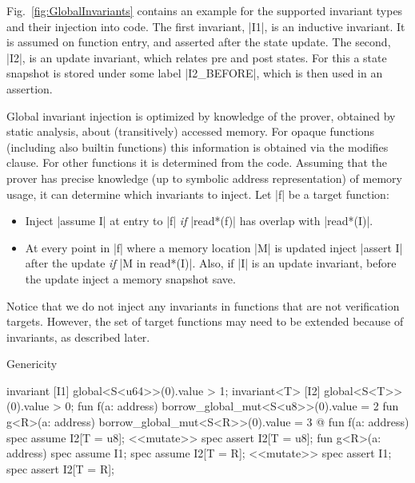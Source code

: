Fig.~\ref{fig:GlobalInvariants} contains an example for the supported invariant
types and their injection into code. The first invariant, |I1|, is an inductive
invariant. It is assumed on function entry, and asserted after the state
update. The second, |I2|, is an update invariant, which relates pre and
post states. For this a state snapshot is stored under some label |I2_BEFORE|,
which is then used in an assertion.


Global invariant injection is optimized by knowledge of the prover, obtained
by static analysis, about (transitively) accessed memory. For opaque functions
(including also builtin functions) this information is obtained via the modifies
clause. For other functions it is determined from the code.  Assuming that the
prover has precise knowledge (up to symbolic address representation) of memory
usage, it can determine which invariants to inject. Let |f| be a target function:

\begin{itemize}
\item Inject |assume I| at entry to |f| \emph{if} |read*(f)| has overlap with
  |read*(I)|.
\item At every point in |f| where a memory location |M| is updated inject
  |assert I| after the update \emph{if} |M in read*(I)|. Also, if |I| is an
  update invariant, before the update inject a memory snapshot save.
\end{itemize}

Notice that we do not inject any invariants in functions that are not
verification targets. However, the set of target functions may need to be
extended because of invariants, as described later.



\begin{Figure}
  \caption{Genericity}
  \label{fig:Genericity}
  \centering
\begin{MoveBox}
  invariant [I1] global<S<u64>>(0).value > 1;
  invariant<T> [I2] global<S<T>>(0).value > 0;
  fun f(a: address) { borrow_global_mut<S<u8>>(0).value = 2 }
  fun g<R>(a: address) { borrow_global_mut<S<R>>(0).value = 3 }
  @\transform@
  fun f(a: address) {
    spec assume I2[T = u8];
    <<mutate>>
    spec assert I2[T = u8];
  }
  fun g<R>(a: address) {
    spec assume I1;
    spec assume I2[T = R];
    <<mutate>>
    spec assert I1;
    spec assert I2[T = R];
  }
\end{MoveBox}
\end{Figure}

